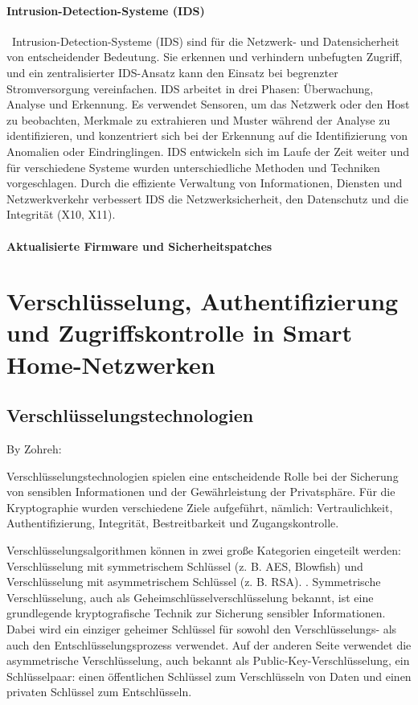 \paragraph{Intrusion-Detection-Systeme (IDS)}
\
Intrusion-Detection-Systeme (IDS) sind für die Netzwerk- und Datensicherheit von entscheidender Bedeutung. Sie erkennen und verhindern unbefugten Zugriff, und ein zentralisierter IDS-Ansatz kann den Einsatz bei begrenzter Stromversorgung vereinfachen. IDS arbeitet in drei Phasen: Überwachung, Analyse und Erkennung. Es verwendet Sensoren, um das Netzwerk oder den Host zu beobachten, Merkmale zu extrahieren und Muster während der Analyse zu identifizieren, und konzentriert sich bei der Erkennung auf die Identifizierung von Anomalien oder Eindringlingen. IDS entwickeln sich im Laufe der Zeit weiter und für verschiedene Systeme wurden unterschiedliche Methoden und Techniken vorgeschlagen. Durch die effiziente Verwaltung von Informationen, Diensten und Netzwerkverkehr verbessert IDS die Netzwerksicherheit, den Datenschutz und die Integrität (X10, X11).

\paragraph{Aktualisierte Firmware und Sicherheitspatches}

\newpage
\section{Verschlüsselung, Authentifizierung und Zugriffskontrolle in Smart Home-Netzwerken}
\subsection{Verschlüsselungstechnologien}

By Zohreh:

Verschlüsselungstechnologien spielen eine entscheidende Rolle bei der Sicherung von sensiblen Informationen und der Gewährleistung der Privatsphäre. 
Für die Kryptographie wurden verschiedene Ziele aufgeführt, nämlich: Vertraulichkeit, Authentifizierung, Integrität, Bestreitbarkeit und Zugangskontrolle. 

Verschlüsselungsalgorithmen können in zwei große Kategorien eingeteilt werden: Verschlüsselung mit symmetrischem Schlüssel (z. B. AES, Blowfish) und Verschlüsselung mit asymmetrischem Schlüssel (z. B. RSA).\cite{thambiraja2012survey} .
Symmetrische Verschlüsselung, auch als Geheimschlüsselverschlüsselung bekannt, ist eine grundlegende kryptografische Technik zur Sicherung sensibler Informationen. Dabei wird ein einziger geheimer Schlüssel für sowohl den Verschlüsselungs- als auch den Entschlüsselungsprozess verwendet.
Auf der anderen Seite verwendet die asymmetrische Verschlüsselung, auch bekannt als Public-Key-Verschlüsselung, ein Schlüsselpaar: einen öffentlichen Schlüssel zum Verschlüsseln von Daten und einen privaten Schlüssel zum Entschlüsseln.

